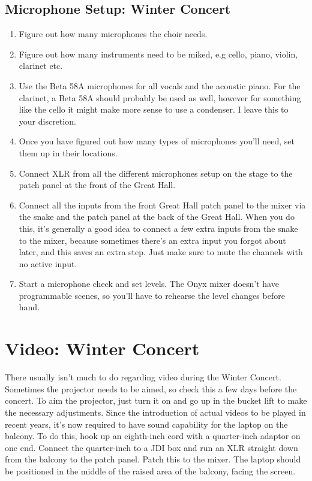 \documentclass[11pt,a4paper]{book}
\begin{document}
\subsection{Microphone Setup: Winter Concert}

\begin{enumerate}
\item Figure out how many microphones the choir needs.
\item Figure out how many instruments need to be miked, e.g cello, piano, violin, clarinet etc.
\item Use the Beta 58A microphones for all vocals and the acoustic piano. For the clarinet, a Beta 58A should probably be used as well, however for something like the cello it might make more sense to use a condenser. I leave this to your discretion.
\item Once you have figured out how many types of microphones you'll need, set them up in their locations.
\item Connect XLR from all the different microphones setup on the stage to the patch panel at the front of the Great Hall.
\item Connect all the inputs from the front Great Hall patch panel to the mixer via the snake and the patch panel at the back of the Great Hall. When you do this, it's generally a good idea to connect a few extra inputs from the snake to the mixer, because sometimes there's an extra input you forgot about later, and this saves an extra step. Just make sure to mute the channels with no active input.
\item Start a microphone check and set levels. The Onyx mixer doesn't have programmable scenes, so you'll have to rehearse the level changes before hand.
\end{enumerate}

\section{Video: Winter Concert}
There usually isn't much to do regarding video during the Winter Concert. Sometimes the projector needs to be aimed, so check this a few days before the concert. To aim the projector, just turn it on and go up in the bucket lift to make the necessary adjustments. Since the introduction of actual videos to be played in recent years, it's now required to have sound capability for the laptop on the balcony. To do this, hook up an eighth-inch cord with a quarter-inch adaptor on one end. Connect the quarter-inch to a JDI box and run an XLR straight down from the balcony to the patch panel. Patch this to the mixer. The laptop should be positioned in the middle of the raised area of the balcony, facing the screen.
\end{document}
